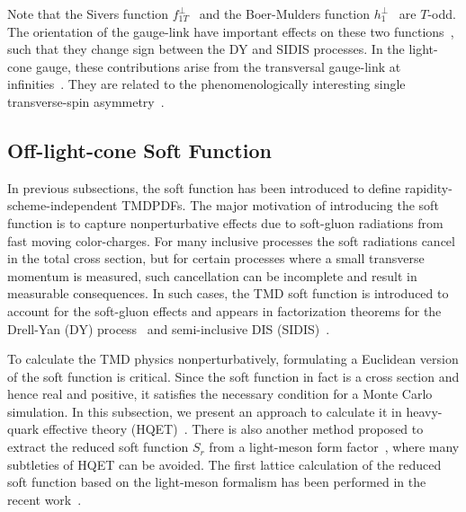 Note that the Sivers function $f^\perp_{1T}$~\cite{Sivers:1989cc} and the Boer-Mulders function $h^\perp_1$~\cite{Boer:1997nt} are $T$-odd. The orientation of the gauge-link have important effects on these two functions~\cite{Collins:2002kn,Collins:2011zzd}, such that they change sign between the DY and SIDIS processes.  In the light-cone gauge, these contributions arise from the transversal gauge-link at infinities~\cite{Belitsky:2002sm}. They are related to the phenomenologically interesting single transverse-spin asymmetry~\cite{Boer:1997nt,Efremov:2004tp,Collins:2005ie,Collins:2005wb}.

\subsection{Off-light-cone Soft Function}
\label{sec:offlight}
In previous subsections, the soft function has been introduced to define rapidity-scheme-independent
TMDPDFs. The major motivation of introducing the soft function is to capture nonperturbative effects due to
soft-gluon radiations from fast moving color-charges.
For many inclusive processes the soft radiations cancel in the total cross section, but for certain processes where a small transverse momentum is measured, such cancellation can be incomplete and result in measurable consequences.
In such cases, the TMD soft function is introduced to account for the soft-gluon effects
and appears in factorization theorems for the Drell-Yan (DY) process~\cite{Collins:1984kg,Collins:1988ig}
and semi-inclusive DIS (SIDIS)~\cite{Ji:2004wu,Ji:2004xq}.

To calculate the TMD physics nonperturbatively, formulating
a Euclidean version of the soft function is critical. Since the soft function in fact is a cross section and hence real and positive,
it satisfies the necessary condition for a Monte Carlo simulation. In this subsection, we present an approach to calculate it
in heavy-quark effective theory (HQET)~\cite{Ji:2019sxk}. There is also another method proposed to extract the reduced soft function $S_r$ from a light-meson form factor~\cite{Ji:2019sxk}, where many subtleties of HQET can be avoided. The first lattice calculation of the reduced soft function based on the light-meson formalism has been performed in the recent work~\cite{Zhang:2020dbb}.

